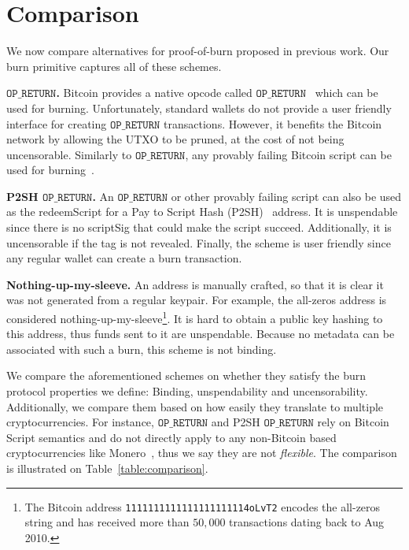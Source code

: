 \section{Comparison}

We now compare alternatives for proof-of-burn proposed in previous work. Our burn primitive captures all of these schemes.

\newcommand{\opreturn}{\texttt{OP\_RETURN}}

\noindent
\textbf{$\opreturn$.}
Bitcoin provides a native opcode called  $\opreturn$~\cite{bartoletti2017analysis} which can be used for burning.
Unfortunately,
standard wallets do not provide a user friendly interface for creating $\opreturn$ transactions.
However, it benefits the Bitcoin network by allowing the UTXO to be pruned, at
the cost of not being uncensorable.
Similarly to $\opreturn$, any provably failing Bitcoin script can be used for
burning~\cite{stewart}.

\noindent
\textbf{P2SH $\opreturn$.}
An $\opreturn$ or other provably failing script can also be used as the redeemScript for a Pay to Script Hash (P2SH)~\cite{p2sh} address. It is unspendable since there is no scriptSig that could make the script succeed. Additionally, it is uncensorable if the tag is not revealed. Finally, the scheme is user friendly since any regular wallet can create a burn transaction.

\noindent
\textbf{Nothing-up-my-sleeve.}
An address is manually crafted, so that it is clear it was not generated from a regular keypair. For example, the all-zeros address is considered nothing-up-my-sleeve\footnote{The Bitcoin address \texttt{1111111111111111111114oLvT2} encodes the all-zeros string and has received more than $50{,}000$ transactions dating back to Aug 2010.}. It is hard to obtain a public key hashing to this address, thus funds sent to it are unspendable. Because no metadata can be associated with such a burn, this scheme is not binding.

We compare the aforementioned schemes on whether they satisfy the burn protocol properties we define: Binding, unspendability and uncensorability. Additionally, we compare them based on how easily they translate to multiple cryptocurrencies. For instance, $\opreturn$ and P2SH $\opreturn$ rely on Bitcoin Script semantics and do not directly apply to any non-Bitcoin based cryptocurrencies like Monero~\cite{van2013cryptonote}, thus we say they are not \emph{flexible}. The comparison is illustrated on Table~\ref{table:comparison}.

